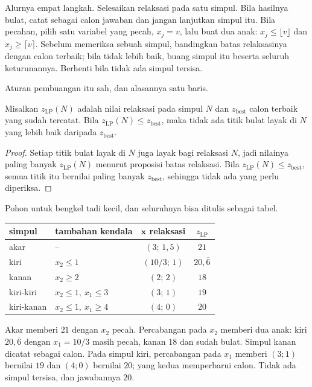 Alurnya empat langkah. Selesaikan relaksasi pada satu simpul. Bila hasilnya
bulat, catat sebagai calon jawaban dan jangan lanjutkan simpul itu. Bila pecahan, pilih satu
variabel yang pecah, $x_{j}=v$, lalu buat dua anak: $x_{j}\le\lfloor v\rfloor$ dan
$x_{j}\ge\lceil v\rceil$. Sebelum memeriksa sebuah simpul, bandingkan batas relaksasinya
dengan calon terbaik; bila tidak lebih baik, buang simpul itu beserta seluruh keturunannya.
Berhenti bila tidak ada simpul tersisa.

Aturan pembuangan itu sah, dan alasannya satu baris.

\begin{proposisi}
Misalkan $z_{\mathrm{LP}}(N)$ adalah nilai relaksasi pada simpul $N$ dan $z_{\mathrm{best}}$
calon terbaik yang sudah tercatat. Bila $z_{\mathrm{LP}}(N)\le z_{\mathrm{best}}$, maka
tidak ada titik bulat layak di $N$ yang lebih baik daripada $z_{\mathrm{best}}$.
\end{proposisi}

\begin{proof}
Setiap titik bulat layak di $N$ juga layak bagi relaksasi $N$, jadi nilainya paling banyak
$z_{\mathrm{LP}}(N)$ menurut proposisi batas relaksasi. Bila
$z_{\mathrm{LP}}(N)\le z_{\mathrm{best}}$, semua titik itu bernilai paling banyak
$z_{\mathrm{best}}$, sehingga tidak ada yang perlu diperiksa.
\end{proof}

Pohon untuk bengkel tadi kecil, dan seluruhnya bisa ditulis sebagai tabel.
\begin{center}
\begin{tabular}{llcc}
\hline
simpul & tambahan kendala & $\mathbf{x}$ relaksasi & $z_{\mathrm{LP}}$ \\
\hline
akar & -- & $(3;\,1{,}5)$ & $21$ \\
kiri & $x_{2}\le1$ & $(10/3;\,1)$ & $20{,}\overline{6}$ \\
kanan & $x_{2}\ge2$ & $(2;\,2)$ & $18$ \\
kiri-kiri & $x_{2}\le1,\ x_{1}\le3$ & $(3;\,1)$ & $19$ \\
kiri-kanan & $x_{2}\le1,\ x_{1}\ge4$ & $(4;\,0)$ & $20$ \\
\hline
\end{tabular}
\end{center}
Akar memberi $21$ dengan $x_{2}$ pecah. Percabangan pada $x_{2}$ memberi dua anak: kiri
$20{,}\overline{6}$ dengan $x_{1}=10/3$ masih pecah, kanan $18$ dan sudah bulat. Simpul kanan
dicatat sebagai calon. Pada simpul kiri, percabangan pada $x_{1}$ memberi $(3;1)$ bernilai
$19$ dan $(4;0)$ bernilai $20$; yang kedua memperbarui calon. Tidak ada simpul tersisa, dan
jawabannya $20$.

